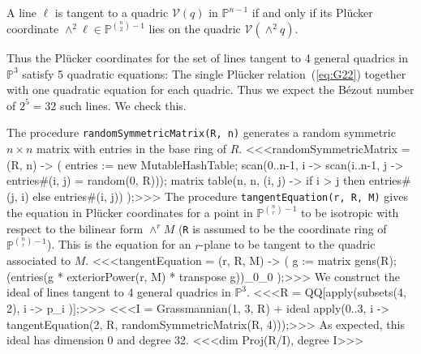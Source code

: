 \begin{proposition}\label{prop:tangent_line}
  A line $\ell$ is tangent to a quadric ${\mathcal V}(q)$ in 
  ${\mathbb P}^{n-1}$ if and only if its Pl\"ucker 
  coordinate  
  $\wedge^2\ell\in{\mathbb P}^{\binom{n}{2}-1}$ lies on the quadric
  ${\mathcal V}(\wedge^2q)$.
\end{proposition}
       
Thus the Pl\"ucker coordinates for the set of lines tangent to 4 general
quadrics in ${\mathbb P}^3$ satisfy 5 quadratic equations:
The single Pl\"ucker relation~(\ref{eq:G22})
together with one quadratic equation for each quadric.
Thus we expect the B\'ezout number of $2^5=32$ such
lines. 
We check this.

The procedure {\tt randomSymmetricMatrix(R, n)}
generates a random symmetric $n\times n$ matrix with entries in 
the base ring of $R$.
%
<<<randomSymmetricMatrix = (R, n) -> (
    entries := new MutableHashTable;
    scan(0..n-1, i -> scan(i..n-1, j -> 
                 entries#(i, j) = random(0, R)));
    matrix table(n, n, (i, j) -> if i > j then 
                 entries#(j, i) else entries#(i, j))
    );>>>
%
The procedure {\tt tangentEquation(r, R, M)} gives the equation in Pl\"ucker
coordinates for a point in ${\mathbb P}^{\binom{n}{r}-1}$ to be
isotropic with respect to the bilinear form  $\wedge^rM$
({\tt R} is assumed to be the coordinate ring of 
${\mathbb P}^{\binom{n}{r}-1}$).
This is the equation for an $r$-plane to be tangent to the quadric
associated to $M$.
%
<<<tangentEquation = (r, R, M) -> (
     g := matrix {gens(R)};
     (entries(g * exteriorPower(r, M) * transpose g))_0_0
     );>>>
%
We construct the ideal of lines tangent to 4 general quadrics in
${\mathbb P}^3$.
%
<<<R = QQ[apply(subsets(4, 2), i -> p_i )];>>>
%
<<<I = Grassmannian(1, 3, R) + ideal apply(0..3, i -> 
     tangentEquation(2, R, randomSymmetricMatrix(R, 4)));>>>
%
As expected, this ideal has dimension 0 and degree 32.
%
<<<dim Proj(R/I), degree I>>>
%


